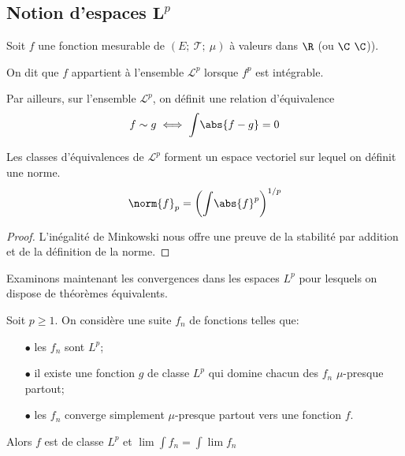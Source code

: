 \subsection{Notion d'espaces $\mathbf L^p$}

\begin{de}
Soit $f$ une fonction mesurable de $\left(E;~\mathcal{T};~\mu\right)$ à valeurs dans $\R$ (ou $\C$ $\C$)).

On dit que $f$ appartient à l'ensemble $\mathcal{L}^p$ lorsque $f^p$ est intégrable.

Par ailleurs, sur l'ensemble $\mathcal{L}^p$, on définit une relation d'équivalence
\[
f \sim g \iff \displaystyle{\int} \abs{f-g} =0
\]

Les classes d'équivalences de $\mathcal{L}^p$ forment un espace vectoriel sur lequel on définit une norme.
\[
\norm{f}_p = \left(\displaystyle{\int} \abs{f}^p\right)^{1/p}
\]
\end{de}

\begin{proof}
L'inégalité de Minkowski nous offre une preuve de la stabilité par addition et de la définition de la norme.
\end{proof}

Examinons maintenant les convergences dans les espaces $L^p$ pour lesquels on dispose de théorèmes équivalents.

\begin{prop}
Soit $p \geq 1$. On considère une suite $f_n$ de fonctions telles que:
\begin{itemize}
\item[$\bullet$] les $f_n$ sont $L^p$;
\item[$\bullet$] il existe une fonction $g$ de classe $L^p$ qui domine chacun des $f_n$ $\mu$-presque partout;
\item[$\bullet$] les $f_n$ converge simplement $\mu$-presque partout vers une fonction $f$. 
\end{itemize}

Alors $f$ est de classe $L^p$ et $\lim \displaystyle{\int} f_n = \displaystyle{\int} \lim f_n$
\end{prop}

